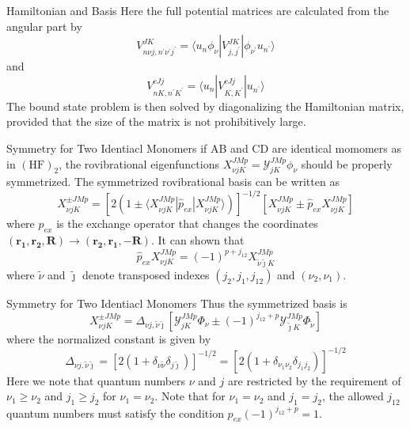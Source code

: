 \documentclass{beamer}
\begin{document}
	\begin{frame}{Hamiltonian and Basis}
		Here the full potential matrices are calculated from the angular part by
		\begin{equation}
			V^{JK}_{n\nu j,n^\prime\nu^\prime j^\prime}=\langle u_n\phi_\nu|V^{JK}_{j,j^\prime}|\phi_{\nu^\prime}u_{n^\prime}\rangle
		\end{equation}
		and
		\begin{equation}
			V^{cJj}_{nK,n^\prime K^\prime}=\langle u_n|V^{cJj}_{K,K^\prime}|u_{n^\prime}\rangle
		\end{equation}
		The bound state problem is then solved by diagonalizing the Hamiltonian matrix, provided that the size of the matrix is not prohibitively large.
	\end{frame}
	\begin{frame}{Symmetry for Two Identiacl Monomers}
		if AB and CD are identical momomers as in $(\mathrm{HF})_2$, the rovibrational eigenfunctions $X^{JMp}_{\nu jK}=\mathcal{Y}^{JMp}_{jK}\phi_\nu$ should be properly symmetrized. The symmetrized rovibrational basis can be written as
		\begin{equation}
			X^{\pm JMp}_{\nu jK}=\left[ 2\left( 1\pm\langle X^{JMp}_{\nu jK}|\hat{p}_{ex}|X^{JMp}_{\nu jK}\rangle\right) \right] ^{-1/2}\left[ X^{JMp}_{\nu jK}\pm\hat{p}_{ex}X^{JMp}_{\nu jK}\right] 
		\end{equation}
		where $\hat{p}_{ex}$ is the exchange operator that changes the coordinates $(\mathbf{r_1},\mathbf{r_2},\mathbf{R})\rightarrow(\mathbf{r_2},\mathbf{r_1},-\mathbf{R})$. It can shown that
		\begin{equation}
			\hat{p}_{ex}X^{JMp}_{\nu jK}=(-1)^{p+j_{12}}X^{JMp}_{\tilde{\nu} \tilde{\jmath}K}
		\end{equation}
		where $\tilde{\nu}$ and $\tilde{\jmath}$ denote transposed indexes $(j_2,j_1,j_{12})$ and $(\nu_2,\nu_1)$.
	\end{frame}
	\begin{frame}{Symmetry for Two Identiacl Monomers}
		Thus the symmetrized basis is
		\begin{equation}
			X^{\pm JMp}_{\nu jK}=\Delta_{\nu j,\tilde{\nu}\tilde{\jmath}}\left[ \mathcal{Y}^{JMp}_{jK}\Phi_\nu\pm(-1)^{j_{12}+p}\mathcal{Y}^{JMp}_{\tilde{\jmath}K}\Phi_{\tilde{\nu}}\right] 
		\end{equation}
		where the normalized constant is given by
		\begin{equation}
			\Delta_{\nu j,\tilde{\nu}\tilde{\jmath}}=[2(1+\delta_{\nu\tilde{\nu}}\delta_{j\tilde{\jmath}})]^{-1/2}=[2(1+\delta_{\nu_1\nu_2}\delta_{j_1j_2})]^{-1/2}
		\end{equation}
		Here we note that quantum numbers $\nu$ and $j$ are restricted by the requirement of $\nu_1\geqslant\nu_2$ and $j_1\geqslant j_2$ for $\nu_1=\nu_2$. Note that for $\nu_1=\nu_2$ and $j_1=j_2$, the allowed $j_{12}$ quantum numbers must satisfy the condition $p_{ex}(-1)^{j_{12}+p}=1$.
	\end{frame}
\end{document}
